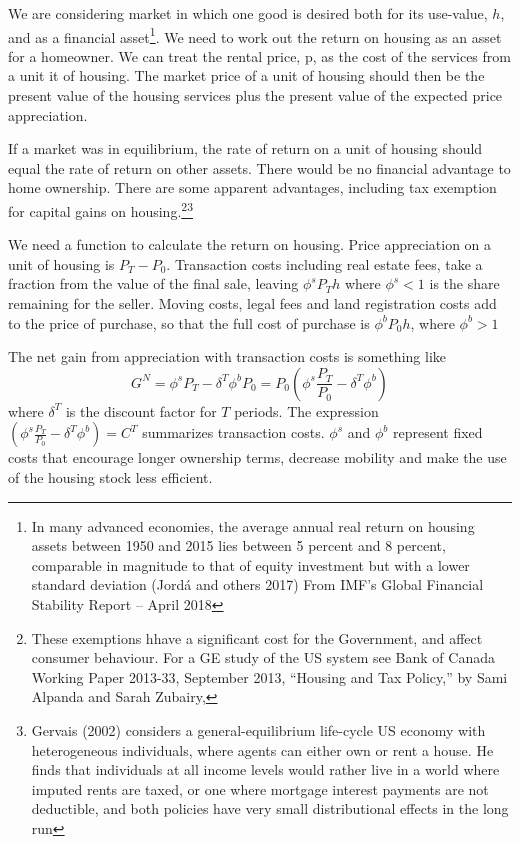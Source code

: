 \documentclass[11pt]{amsart}
\begin{document}
We are considering market in which one good is desired  both for its use-value, $h$, and as a financial asset\footnote{ In many advanced economies, the average annual real return on housing assets between 1950 and 2015 lies between 5 percent and 8 percent, comparable in magnitude to that of equity investment but with a lower standard deviation (Jord\'a and others 2017) From IMF’s Global Financial Stability Report – April 2018}.   We need to work out the return on housing as an asset for a homeowner. We can treat the rental price, p, as the cost of the services from a unit it of housing. The market price of a unit of housing  should then be the present value of the housing services plus the present value of the expected price appreciation. 

If a market was in equilibrium, the rate of return on a unit of housing should equal the rate of return on other assets. There would be no financial advantage to home ownership. There are some apparent advantages, including  tax exemption for capital gains on housing.\footnote{These exemptions hhave a significant cost for the Government, and affect consumer behaviour. For a GE study of  the US system see Bank of Canada Working Paper 2013-33, September 2013, ``Housing and Tax Policy,'' by Sami Alpanda and Sarah Zubairy,}\footnote{Gervais (2002) considers a general-equilibrium life-cycle US economy with heterogeneous individuals, where agents can either own or rent a house. He finds that individuals at all income levels would rather live in a world where imputed rents are taxed, or one where mortgage interest payments are not deductible, and both policies have very small distributional effects in the long run}


We need a function to calculate the return on housing.  Price appreciation on a unit of housing is $P_T-P_0$. Transaction costs including real estate fees, take a fraction from the value of the final sale, leaving $\phi^sP_Th$ where $\phi^s<1$ is the share remaining for the seller. Moving costs, legal fees and land registration costs add to the price of purchase, so that the full cost of purchase is $\phi^bP_0h$, where $\phi^b>1$

The net gain from appreciation with transaction costs is something like \[G^N=\phi^s P_T-\delta^T\phi^b P_0=P_0(\phi^s \frac{P_T}{P_0}-\delta^T\phi^b)\]%
where $\delta^T$ is the discount factor for $T$ periods. The expression $(\phi^s \frac{P_T}{P_0}-\delta^T\phi^b)=C^T$ summarizes transaction costs. $\phi^s$ and $\phi^b$ represent  fixed costs that  encourage longer ownership terms, decrease mobility and make the use of the housing stock less efficient. 
\end{document}
